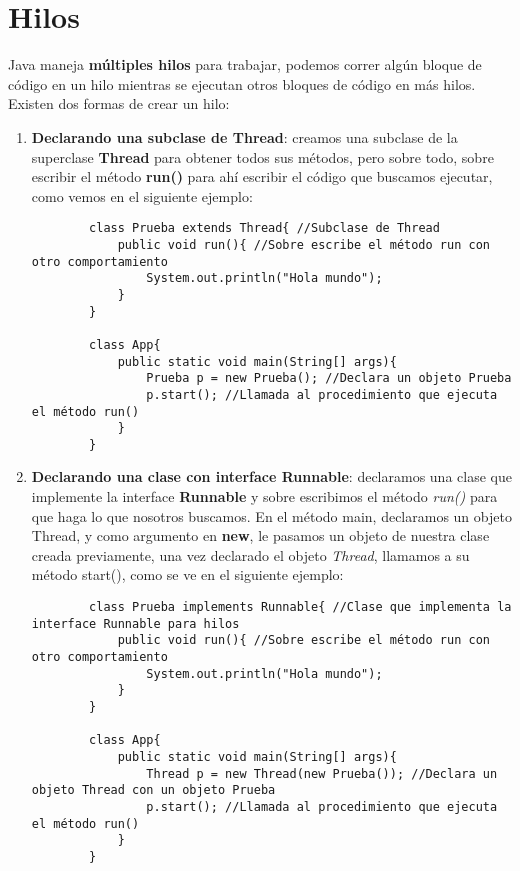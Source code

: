 \section{Hilos}
\hspace{0.55cm}Java maneja \textbf{múltiples hilos} para trabajar, podemos correr algún bloque de código en un hilo mientras se ejecutan otros bloques de código en más hilos. Existen dos formas de crear un hilo:
\begin{enumerate}
    \item \textbf{Declarando una subclase de Thread}: creamos una subclase de la superclase \textbf{Thread} para obtener todos sus métodos, pero sobre todo, sobre escribir el método \textbf{run()} para ahí escribir el código que buscamos ejecutar, como vemos en el siguiente ejemplo:
    \begin{lstlisting}
        class Prueba extends Thread{ //Subclase de Thread
            public void run(){ //Sobre escribe el método run con otro comportamiento
                System.out.println("Hola mundo");
            }
        }
        
        class App{
            public static void main(String[] args){
                Prueba p = new Prueba(); //Declara un objeto Prueba
                p.start(); //Llamada al procedimiento que ejecuta el método run()
            }
        }
    \end{lstlisting}
    \item \textbf{Declarando una clase con interface Runnable}: declaramos una clase que implemente la interface \textbf{Runnable} y sobre escribimos el método \textit{run()} para que haga lo que nosotros buscamos. En el método main, declaramos un objeto Thread, y como argumento en \textbf{new}, le pasamos un objeto de nuestra clase creada previamente, una vez declarado el objeto \textit{Thread}, llamamos a su método start(), como se ve en el siguiente ejemplo:
    \begin{lstlisting}
        class Prueba implements Runnable{ //Clase que implementa la interface Runnable para hilos
            public void run(){ //Sobre escribe el método run con otro comportamiento
                System.out.println("Hola mundo");
            }
        }
        
        class App{
            public static void main(String[] args){
                Thread p = new Thread(new Prueba()); //Declara un objeto Thread con un objeto Prueba
                p.start(); //Llamada al procedimiento que ejecuta el método run()
            }
        }
    \end{lstlisting}
\end{enumerate}

